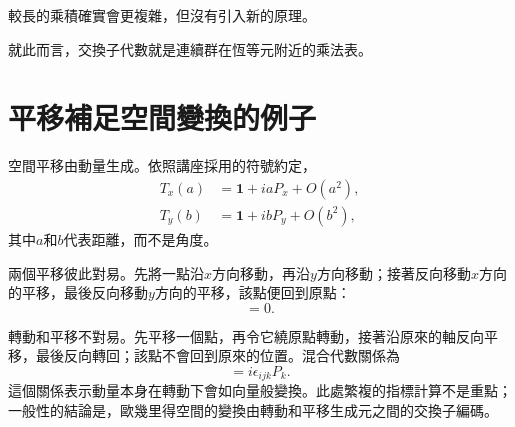 \begin{classroomqa}
\end{classroomqa}

較長的乘積確實會更複雜，但沒有引入新的原理。

\begin{classroomqa}
\end{classroomqa}

就此而言，交換子代數就是連續群在恆等元附近的乘法表。

\section{平移補足空間變換的例子}

空間平移由動量生成。依照講座採用的符號約定，
\begin{equation}
\begin{aligned}
T_x(a)&=\mathbf 1+iaP_x+O(a^2),\\
T_y(b)&=\mathbf 1+ibP_y+O(b^2),
\end{aligned}
\end{equation}
其中\(a\)和\(b\)代表距離，而不是角度。

兩個平移彼此對易。先將一點沿\(x\)方向移動，再沿\(y\)方向移動；接著反向移動\(x\)方向的平移，最後反向移動\(y\)方向的平移，該點便回到原點：
\begin{equation}
[P_i,P_j]=0.
\end{equation}

\begin{classroomqa}
\end{classroomqa}

轉動和平移不對易。先平移一個點，再令它繞原點轉動，接著沿原來的軸反向平移，最後反向轉回；該點不會回到原來的位置。混合代數關係為
\begin{equation}
[L_i,P_j]=i\epsilon_{ijk}P_k.
\end{equation}
這個關係表示動量本身在轉動下會如向量般變換。此處繁複的指標計算不是重點；一般性的結論是，歐幾里得空間的變換由轉動和平移生成元之間的交換子編碼。


